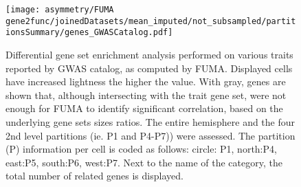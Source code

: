 \begin{figure}[H]
	\begin{adjustwidth}{-3cm}{-2.5cm}
	\centering
	\texttt{[image: asymmetry/FUMA gene2func/joinedDatasets/mean\_imputed/not\_subsampled/partitionsSummary/genes\_GWASCatalog.pdf]}
	
	\caption[GWAS Catalog GSEA genes]{Differential gene set enrichment analysis performed on various traits reported by GWAS catalog, as computed by FUMA. Displayed cells have increased lightness the higher the value. With gray, genes are shown that, although intersecting with the trait gene set, were not enough for FUMA to identify significant correlation, based on the underlying gene sets sizes ratios.  The entire hemisphere and the four 2nd level partitions (ie. P1 and P4-P7)) were assessed. The partition (P) information per cell is coded as follows: circle: P1, north:P4, east:P5, south:P6, west:P7. Next to the name of the category, the total number of related genes is displayed.}
	\label{fig:gw_catalog_genes}
\end{adjustwidth}
\end{figure}